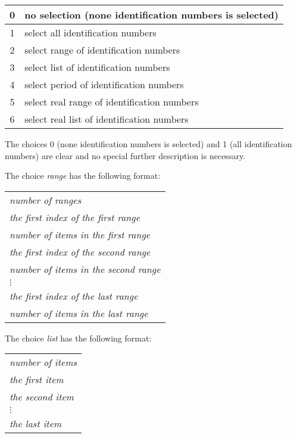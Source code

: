 \begin{table}[h]
\begin{center}
\begin{tabular}{|c|l|}
\hline
 0 & no selection (none identification numbers is selected)
\\ \hline
 1 & select all identification numbers
\\ \hline
 2 & select range of identification numbers
\\ \hline
 3 & select list of identification numbers
\\ \hline
 4 & select period of identification numbers
\\ \hline
 5 & select real range of identification numbers
\\ \hline
 6 & select real list of identification numbers
\\ \hline
\end{tabular}
\label{tabselect}
\end{center}
\end{table}

The choices 0 (none identification numbers is selected) and 1 (all identification numbers) are clear
and no special further description is necessary.


The choice {\it range} has the following format:

\begin{tabular}{l}
{\it number of ranges}
\\
{\it the first index of the first range}
\\
{\it number of items in the first range}
\\
{\it the first index of the second range}
\\
{\it number of items in the second range}
\\
$\vdots$
\\
{\it the first index of the last range}
\\
{\it number of items in the last range}
\\
\end{tabular}


The choice {\it list} has the following format:

\begin{tabular}{l}
{\it number of items}
\\
{\it the first item}
\\
{\it the second item}
\\
$\vdots$
\\
{\it the last item}
\\
\end{tabular}


